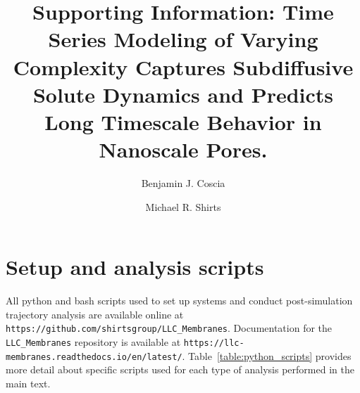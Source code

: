 \documentclass{article}
\title{Supporting Information: Time Series Modeling of Varying Complexity Captures 
Subdiffusive Solute Dynamics and Predicts Long Timescale Behavior in Nanoscale Pores.}
\author{Benjamin J. Coscia \and Michael R. Shirts}
\begin{document}
  \maketitle
  \tableofcontents
  \graphicspath{{./supporting_figures/}}
  
  
  \newpage  
  
  \section{Setup and analysis scripts}\label{section:python_scripts}

  All python and bash scripts used to set up systems and conduct post-simulation trajectory
  analysis are available online at \texttt{https://github.com/shirtsgroup/LLC\_Membranes}.
  Documentation for the \texttt{LLC\_Membranes} repository is available at
  \texttt{https://llc-membranes.readthedocs.io/en/latest/}. Table~\ref{table:python_scripts}
  provides more detail about specific scripts used for each type of analysis performed in
  the main text.
\end{document}
